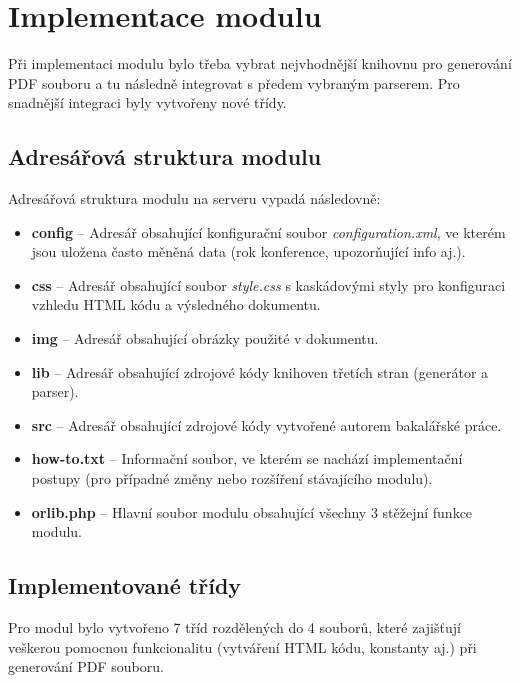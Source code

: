 \DeclarePairedDelimiter\ceil{\lceil}{\rceil}
\DeclarePairedDelimiter\floor{\lfloor}{\rfloor}

\chapter{Implementace modulu}
Při implementaci modulu bylo třeba vybrat nejvhodnější knihovnu pro generování PDF souboru a tu následně integrovat s předem vybraným parserem. Pro snadnější integraci byly vytvořeny nové třídy.
\section{Adresářová struktura modulu}
Adresářová struktura modulu na serveru vypadá následovně:
\begin{itemize}
	\item \textbf{config} -- Adresář obsahující konfigurační soubor \textit{configuration.xml}, ve kterém jsou uložena často měněná data (rok konference, upozorňující info aj.).  
	\item \textbf{css} --  Adresář obsahující soubor \textit{style.css} s kaskádovými styly pro konfiguraci vzhledu HTML kódu a výsledného dokumentu. 
	\item \textbf{img} -- Adresář obsahující obrázky použité v dokumentu.
	\item \textbf{lib} -- Adresář obsahující zdrojové kódy knihoven třetích stran (generátor a parser).
	\item \textbf{src} -- Adresář obsahující zdrojové kódy vytvořené autorem bakalářské práce.
	\item \textbf{how-to.txt} -- Informační soubor, ve kterém se nachází implementační postupy (pro případné změny nebo rozšíření stávajícího modulu).
	\item \textbf{orlib.php} -- Hlavní soubor modulu obsahující všechny 3 stěžejní funkce modulu.
\end{itemize}
\section{Implementované třídy}
Pro modul bylo vytvořeno 7 tříd rozdělených do 4 souborů, které zajišťují veškerou pomocnou funkcionalitu (vytváření HTML kódu, konstanty aj.) při generování PDF souboru. 
